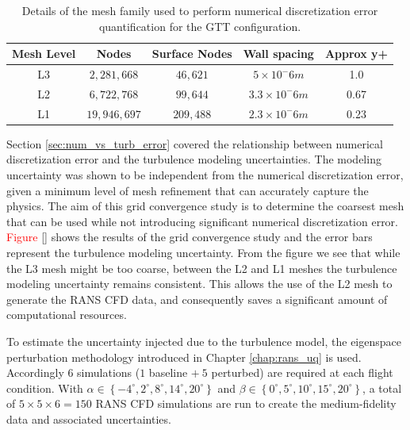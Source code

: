 \begin{table}
    \renewcommand{\arraystretch}{1.2}
    \centering
    \begin{tabular}{ c|c|c|c|c } 
         Mesh Level & Nodes & Surface Nodes & Wall spacing & Approx y+  \\ 
         \hline
         L3 & $2,281,668$ & $46,621$ & $5\times10^-6 m$ & 1.0 \\
         L2 & $6,722,768$ & $99,644$ & $3.3\times10^-6 m$ & 0.67 \\
         L1 & $19,946,697$ & $209,488$ & $2.3\times10^-6 m$ & 0.23 \\
         
    \end{tabular}
    \caption{Details of the mesh family used to perform numerical discretization error quantification for the GTT configuration.}
    \label{tab:gtt_meshes}
\end{table}

Section \ref{sec:num_vs_turb_error} covered the relationship between numerical discretization error and the turbulence modeling uncertainties. 
The modeling uncertainty was shown to be independent from the numerical discretization error, given a minimum level of mesh refinement that can accurately capture the physics. 
The aim of this grid convergence study is to determine the coarsest mesh that can be used while not introducing significant numerical discretization error. 
\textcolor{red}{Figure \ref{}} shows the results of the grid convergence study and the error bars represent the turbulence modeling uncertainty. 
From the figure we see that while the L3 mesh might be too coarse, between the L2 and L1 meshes the turbulence modeling uncertainty remains consistent. 
This allows the use of the L2 mesh to generate the RANS CFD data, and consequently saves a significant amount of computational resources. 

To estimate the uncertainty injected due to the turbulence model, the eigenspace perturbation methodology introduced in Chapter \ref{chap:rans_uq} is used. 
Accordingly $6$ simulations ($1$ baseline $+~5$ perturbed) are required at each flight condition. 
With $\alpha \in \left \{ -4^\circ,2^\circ,8^\circ,14^\circ,20^\circ \right \}$ and $\beta \in \left \{ 0^\circ,5^\circ,10^\circ,15^\circ,20^\circ \right \}$, a total of $5\times5\times6 = 150$ RANS CFD simulations are run to create the medium-fidelity data and associated uncertainties. 

